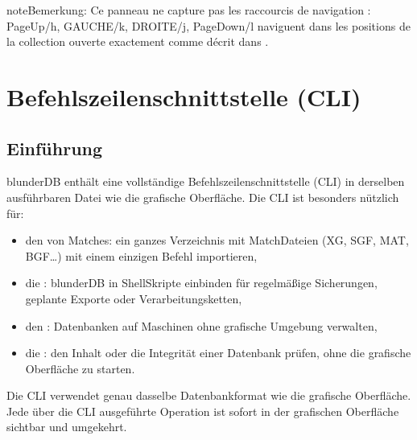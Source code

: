 \documentclass[letterpaper,10pt,german]{sphinxmanual}
\begin{document}
\begin{sphinxadmonition}{note}{Bemerkung:}
\sphinxAtStartPar
Ce panneau ne capture pas les raccourcis de navigation :
PageUp/h, GAUCHE/k, DROITE/j, PageDown/l naviguent dans les positions de
la collection ouverte exactement comme décrit dans
{\hyperref[\detokenize{raccourcis:raccourcis-navigation}]{}}.
\end{sphinxadmonition}

\sphinxstepscope


\section{Befehlszeilenschnittstelle (CLI)}
\label{\detokenize{cli:interface-en-ligne-de-commande-cli}}\label{\detokenize{cli:cli}}\label{\detokenize{cli::doc}}

\subsection{Einführung}
\label{\detokenize{cli:introduction}}
\sphinxAtStartPar
blunderDB enthält eine vollständige Befehlszeilenschnittstelle (CLI) in derselben ausführbaren Datei wie die grafische Oberfläche. Die CLI ist besonders nützlich für:
\begin{itemize}
\item {} 
\sphinxAtStartPar
den  von Matches: ein ganzes Verzeichnis mit Match\sphinxhyphen{}Dateien (XG, SGF, MAT, BGF…) mit einem einzigen Befehl importieren,

\item {} 
\sphinxAtStartPar
die : blunderDB in Shell\sphinxhyphen{}Skripte einbinden für regelmäßige Sicherungen, geplante Exporte oder Verarbeitungsketten,

\item {} 
\sphinxAtStartPar
den : Datenbanken auf Maschinen ohne grafische Umgebung verwalten,

\item {} 
\sphinxAtStartPar
die : den Inhalt oder die Integrität einer Datenbank prüfen, ohne die grafische Oberfläche zu starten.

\end{itemize}

\sphinxAtStartPar
Die CLI verwendet genau dasselbe Datenbankformat wie die grafische Oberfläche. Jede über die CLI ausgeführte Operation ist sofort in der grafischen Oberfläche sichtbar und umgekehrt.
\end{document}
